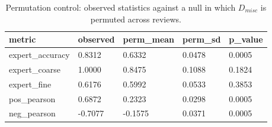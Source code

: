 \begin{table}[htbp]
\centering
\caption{Permutation control: observed statistics against a null in which $D_{misc}$ is permuted across reviews.}
\label{tab:permutation-control}
\begin{tabular}{lllll}
\toprule
metric & observed & perm\_mean & perm\_sd & p\_value \\
\midrule
expert\_accuracy & 0.8312 & 0.6332 & 0.0478 & 0.0005 \\
expert\_coarse & 1.0000 & 0.8475 & 0.1088 & 0.1824 \\
expert\_fine & 0.6176 & 0.5992 & 0.0533 & 0.3853 \\
pos\_pearson & 0.6872 & 0.2323 & 0.0298 & 0.0005 \\
neg\_pearson & -0.7077 & -0.1575 & 0.0371 & 0.0005 \\
\bottomrule
\end{tabular}
\end{table}
